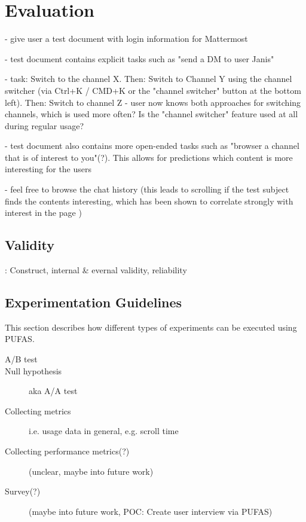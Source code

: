 %
\chapter{Evaluation}
\label{ch:evaluation}

- give user a test document with login information for Mattermost

- test document contains explicit tasks such as "send a DM to user Janis"

- task: Switch to the channel X. Then: Switch to Channel Y using the channel switcher (via Ctrl+K / CMD+K or the "channel switcher" button at the bottom left). Then: Switch to channel Z - user now knows both approaches for switching channels, which is used more often? Is the "channel switcher" feature used at all during regular usage?

- test document also contains more open-ended tasks such as "browser a channel that is of interest to you"(?).
This allows for predictions which content is more interesting for the users

- feel free to browse the chat history (this leads to scrolling if the test subject finds the contents interesting, which has been shown to correlate strongly with interest in the page \cite{Claypool2001})


\section{Validity}
\label{sec:evaluation:validity}

\cite{Easterbrook2008a}: Construct, internal \& evernal validity, reliability

\section{Experimentation Guidelines}

This section describes how different types of experiments can be executed using \ac{PUFAS}.

\begin{description}
\item[A/B test]
\item[Null hypothesis] aka A/A test \cite{Kohavi2009}
\item[Collecting metrics] i.e. usage data in general, e.g. scroll time
\item[Collecting performance metrics(?)] (unclear, maybe into future work)
\item[Survey(?)] (maybe into future work, POC: Create user interview via \ac{PUFAS})
\end{description}

